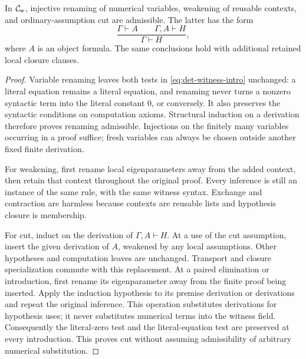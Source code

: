 \begin{lemma}
\label{lem:det-witness-cut}
In $\mathcal C_{\rm w}$, injective renaming of numerical variables,
weakening of reusable contexts, and ordinary-assumption cut are
admissible.  The latter has the form
\[
 \frac{\Gamma\vdash A\qquad\Gamma,A\vdash H}
      {\Gamma\vdash H},
\]
where $A$ is an object formula.  The same conclusions hold with additional
retained local closure clauses.
\end{lemma}
\begin{proof}
Variable renaming leaves both tests in
\eqref{eq:det-witness-intro} unchanged: a literal equation remains a
literal equation, and renaming never turns a nonzero syntactic term
into the literal constant $0$, or conversely.  It also preserves the
syntactic conditions on computation axioms.  Structural induction on
a derivation therefore proves renaming admissible.  Injections on the
finitely many variables occurring in a proof suffice; fresh variables
can always be chosen outside another fixed finite derivation.

For weakening, first rename local eigenparameters away from the added
context, then retain that context throughout the original proof.
Every inference is still an instance of the same rule, with the same
witness syntax.  Exchange and contraction are harmless because contexts
are reusable lists and hypothesis closure is membership.

For cut, induct on the derivation of $\Gamma,A\vdash H$.  At a use
of the cut assumption, insert the given derivation of $A$, weakened by
any local assumptions.  Other hypotheses and computation leaves are
unchanged.  Transport and closure specialization commute with this
replacement.  At a paired elimination or introduction, first rename
its eigenparameter away from the finite proof being inserted.  Apply
the induction hypothesis to its premise derivation or derivations and
repeat the original inference.  This operation substitutes derivations
for hypothesis uses; it never substitutes numerical terms into the
witness field.  Consequently the literal-zero test and the
literal-equation test are preserved at every introduction.  This proves
cut without assuming admissibility of arbitrary numerical substitution.
\end{proof}

